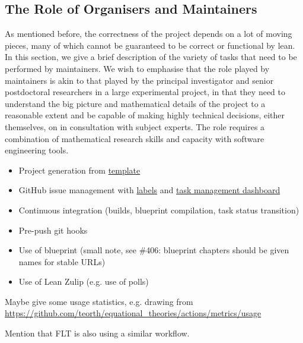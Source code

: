\subsection{The Role of Organisers and Maintainers}
As mentioned before, the correctness of the project depends on a lot of moving pieces, many of which cannot be guaranteed to be correct or functional by lean. In this section, we give a brief description of the variety of tasks that need to be performed by maintainers. We wish to emphasise that the role played by maintainers is akin to that played by the principal investigator and senior postdoctoral researchers in a large experimental project, in that they need to understand the big picture and mathematical details of the project to a reasonable extent and be capable of making highly technical decisions, either themselves, on in consultation with subject experts. The role requires a  combination of mathematical research skills and capacity with software engineering tools.

\begin{itemize}
    \item Project generation from \href{https://github.com/pitmonticone/LeanProject}{template}
    \item GitHub issue management with \href{https://github.com/teorth/equational_theories/labels}{labels} and \href{https://github.com/users/teorth/projects/1}{task management dashboard}
    \item Continuous integration (builds, blueprint compilation, task status transition)
    \item Pre-push git hooks
    \item Use of blueprint (small note, see \#406: blueprint chapters should be given names for stable URLs)
    \item Use of Lean Zulip (e.g. use of polls)
\end{itemize}

Maybe give some usage statistics, e.g. drawing from \url{https://github.com/teorth/equational_theories/actions/metrics/usage}

Mention that FLT is also using a similar workflow.


